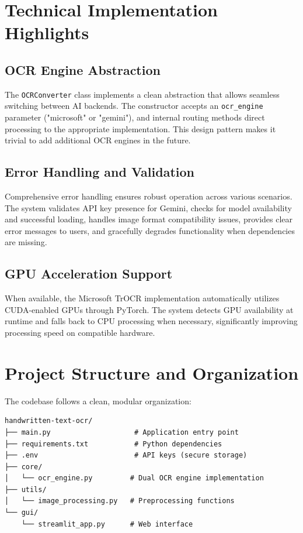 \documentclass[12pt,a4paper]{article}
\begin{document}
\section{Technical Implementation Highlights}

\subsection{OCR Engine Abstraction}
The \texttt{OCRConverter} class implements a clean abstraction that allows seamless switching between AI backends. The constructor accepts an \texttt{ocr\_engine} parameter ("microsoft" or "gemini"), and internal routing methods direct processing to the appropriate implementation. This design pattern makes it trivial to add additional OCR engines in the future.

\subsection{Error Handling and Validation}
Comprehensive error handling ensures robust operation across various scenarios. The system validates API key presence for Gemini, checks for model availability and successful loading, handles image format compatibility issues, provides clear error messages to users, and gracefully degrades functionality when dependencies are missing.

\subsection{GPU Acceleration Support}
When available, the Microsoft TrOCR implementation automatically utilizes CUDA-enabled GPUs through PyTorch. The system detects GPU availability at runtime and falls back to CPU processing when necessary, significantly improving processing speed on compatible hardware.

\section{Project Structure and Organization}

The codebase follows a clean, modular organization:

\begin{verbatim}
handwritten-text-ocr/
├── main.py                    # Application entry point
├── requirements.txt           # Python dependencies
├── .env                       # API keys (secure storage)
├── core/
│   └── ocr_engine.py         # Dual OCR engine implementation
├── utils/
│   └── image_processing.py   # Preprocessing functions
└── gui/
    └── streamlit_app.py      # Web interface
\end{verbatim}
\end{document}
